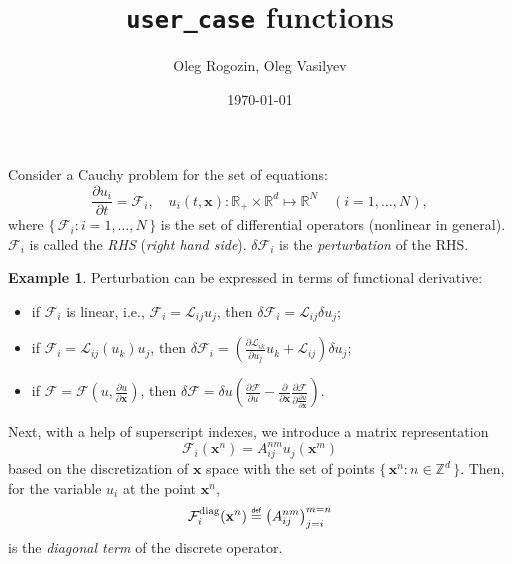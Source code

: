 \documentclass{article}
\title{\texttt{user\_case} functions}
\date{\today}
\author{Oleg Rogozin, Oleg Vasilyev}
\newcommand{\pder}[2][]{\frac{\partial#1}{\partial#2}}
\newcommand{\LL}{\mathcal{L}}
\newcommand{\FF}{\mathcal{F}}
\newcommand{\bx}{\mathbf x}
\newcommand{\diag}{^\mathrm{diag}}
\newcommand{\pert}[1]{\delta#1}
\newcommand{\Set}[2]{\{\,{#1}:{#2}\,\}}
\newcommand{\eqdef}{\mathrel{\overset{\makebox[0pt]{\mbox{\normalfont\tiny\sffamily def}}}{=}}}
\theoremstyle{definition}
\newtheorem{example}{Example}
\begin{document}
\maketitle

Consider a Cauchy problem for the set of equations:
\begin{equation}\label{eq:problem}
    \pder[u_i]{t} = \FF_i, \quad
    u_i(t,\bx): \mathbb{R}_+\times\mathbb{R}^d\mapsto\mathbb{R}^N \quad (i=1,\dots,N),
\end{equation}
where \(\Set{\FF_i}{i=1,\dots,N}\) is the set of differential operators (nonlinear in general).
\(\FF_i\) is called the \emph{RHS} (\emph{right hand side}).
\(\pert{\FF_i}\) is the \emph{perturbation} of the RHS.
\begin{example}
Perturbation can be expressed in terms of functional derivative:
\begin{itemize}
    \item if \(\FF_i\) is linear, i.e., \(\FF_i = \LL_{ij}u_j\), then
        \(\pert{\FF_i} = \LL_{ij}\pert{u}_j\);
    \item if \(\FF_i = \LL_{ij}(u_k)u_j\), then
        \(\pert{\FF_i} = \left( \pder[\LL_{ik}]{u_j}u_k + \LL_{ij} \right)\pert{u}_j\);
    \item if \(\FF = \FF(u, \pder[u]{\bx})\), then
        \(\pert{\FF} = \pert{u}\left(\pder[\FF]{u} - \pder{\bx}\pder[\FF]{\pder[u]{\bx}}\right)\).
\end{itemize}
\end{example}
Next, with a help of superscript indexes, we introduce a matrix representation
\begin{equation}\label{eq:matrix_representation}
       \FF_i(\bx^n) = A_{ij}^{nm}u_j(\bx^m)
\end{equation}
based on the discretization of \(\bx\) space with the set of points \(\Set{\bx^n}{n\in\mathbb{Z}^d}\).
Then, for the variable \(u_i\) at the point \(\bx^n\),
\begin{equation}\label{eq:diagonal_term}
     \FF_i\diag(\bx^n) \eqdef \left( A_{ij}^{nm} \right)_{j=i}^{m=n}
\end{equation}
is the \emph{diagonal term} of the discrete operator.
\end{document}
